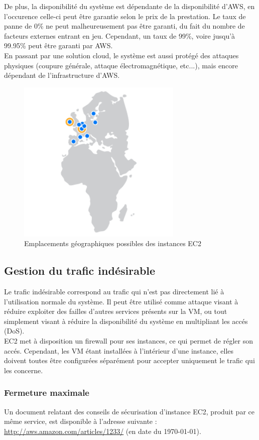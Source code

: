 De plus, la disponibilité du système est dépendante de la disponibilité d'AWS,
en l'occurence celle-ci peut être garantie selon le prix de la prestation. Le
taux de panne de 0\% ne peut malheureusement pas être garanti, du fait du
nombre de facteurs externes entrant en jeu. Cependant, un taux de 99\%, voire
jusqu'à 99.95\% peut être garanti par AWS. \\

En passant par une solution cloud, le système est aussi protégé des attaques
physiques (coupure générale, attaque électromagnétique, etc...), mais encore
dépendant de l'infrastructure d'AWS.

\begin{figure}[h]
    \centering
    \includegraphics[width=0.7\textwidth]{aws-europe}
    \caption{Emplacements géographiques possibles des instances EC2}
    \label{fig:aws-europe}
\end{figure}

\subsection{Gestion du trafic indésirable}

Le trafic indésirable correspond au trafic qui n'est pas directement lié à
l'utilisation normale du système. Il peut être utilisé comme attaque visant à
réduire exploiter des failles d'autres services présents sur la VM, ou tout
simplement visant à réduire la disponibilité du système en multipliant les
accés (DoS). \\

EC2 met à disposition un firewall pour ses instances, ce qui permet de régler
son accés. Cependant, les VM étant installées à l'intérieur d'une instance,
elles doivent toutes être configurées séparément pour accepter uniquement le
trafic qui les concerne.

\subsubsection{Fermeture maximale}

Un document relatant des conseils de sécurisation d'instance EC2, produit par
ce même service, est disponible à l'adresse suivante :
\url{http://aws.amazon.com/articles/1233/} (en date du \today).


